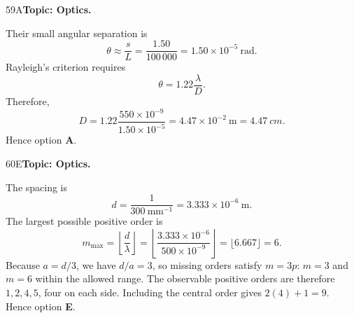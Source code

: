 \documentclass[10pt,a4paper]{physicsquiz}
\begin{document}
\begin{workedsolution}{59}{A}\textbf{Topic: Optics.}\par Their small angular separation is
  \[
    \theta\approx\frac{s}{L}=\frac{1.50}{100\,000}=1.50\times10^{-5}\ \mathrm{rad}.
  \]
  Rayleigh's criterion requires
  \[
    \theta=1.22\frac{\lambda}{D}.
  \]
  Therefore,
  \[
    D=1.22\frac{550\times10^{-9}}{1.50\times10^{-5}}
    =4.47\times10^{-2}\ \mathrm{m}
    =\SI{4.47}{cm}.
  \]
  Hence option \textbf{A}.\end{workedsolution}
\begin{workedsolution}{60}{E}\textbf{Topic: Optics.}\par The spacing is
  \[
    d=\frac{1}{300\ \mathrm{mm}^{-1}}=3.333\times10^{-6}\ \mathrm{m}.
  \]
  The largest possible positive order is
  \[
    m_{\max}=\left\lfloor\frac{d}{\lambda}\right\rfloor
    =\left\lfloor\frac{3.333\times10^{-6}}{500\times10^{-9}}\right\rfloor
    =\lfloor6.667\rfloor=6.
  \]
  Because \(a=d/3\), we have \(d/a=3\), so missing orders satisfy \(m=3p\): \(m=3\) and \(m=6\) within the allowed range. The observable positive orders are therefore \(1,2,4,5\), four on each side. Including the central order gives \(2(4)+1=9\). Hence option \textbf{E}.\end{workedsolution}
\clearpage
\end{document}
